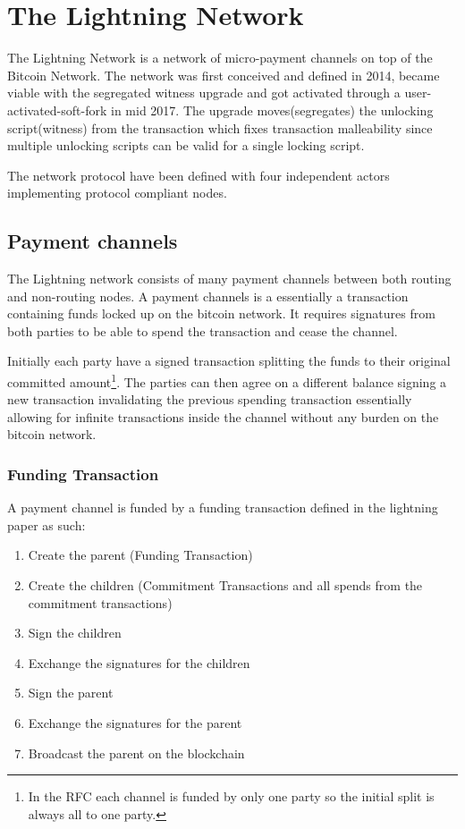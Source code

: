 \chapter{The Lightning Network}
\label{sec:lightning:network}

The Lightning Network is a network of micro-payment channels on top of the Bitcoin Network. The network was first conceived and defined in 2014\cite{poon:dryja:lightning:network}, became viable with the segregated witness upgrade\cite{bip:0141:segwit} and got activated through a user-activated-soft-fork in mid 2017\cite{bip:uasf:segwit}. The upgrade moves(segregates) the unlocking script(witness) from the transaction which fixes transaction malleability since multiple unlocking scripts can be valid for a single locking script. 

The network protocol have been defined\cite{repository:lightning:rfc} with four independent actors implementing protocol compliant nodes\cite{repository:lnd}\cite{repository:eclair}\cite{repository:clightning}\cite{repository:lit}.

\section{Payment channels}

The Lightning network consists of many payment channels between both routing and non-routing nodes.
A payment channels is a essentially a transaction containing funds locked up on the bitcoin network. It requires signatures from both parties to be able to spend the transaction and cease the channel.

Initially each party have a signed transaction splitting the funds to their original committed amount\footnote{In the RFC each channel is funded by only one party so the initial split is always all to one party.}. The parties can then agree on a different balance signing a new transaction invalidating the previous spending transaction essentially allowing for infinite transactions inside the channel without any burden on the bitcoin network.

\subsection{Funding Transaction}

A payment channel is funded by a funding transaction defined in the lightning paper as such\cite{poon:dryja:lightning:network}:
\begin{enumerate}
	\item  Create the parent (Funding Transaction)
	\item  Create the children (Commitment Transactions and all spends from the commitment transactions)
	\item  Sign the children
	\item  Exchange the signatures for the children
	\item  Sign the parent
	\item  Exchange the signatures for the parent
	\item  Broadcast the parent on the blockchain
\end{enumerate}

